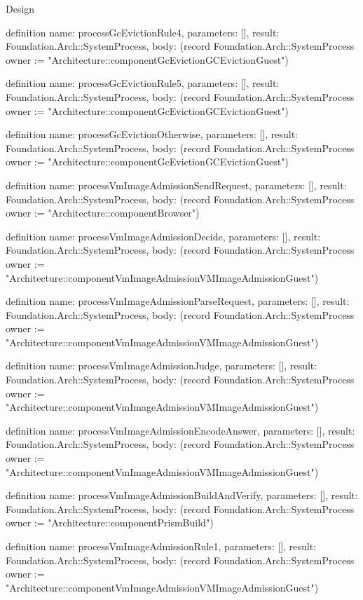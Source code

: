 \begin{lexlean}{Design}
\begin{semanticmodule}
definition{
  name: processGcEvictionRule4,
  parameters: [],
  result: Foundation.Arch::SystemProcess,
  body: (record Foundation.Arch::SystemProcess {owner := "Architecture::componentGcEvictionGCEvictionGuest"})
}

definition{
  name: processGcEvictionRule5,
  parameters: [],
  result: Foundation.Arch::SystemProcess,
  body: (record Foundation.Arch::SystemProcess {owner := "Architecture::componentGcEvictionGCEvictionGuest"})
}

definition{
  name: processGcEvictionOtherwise,
  parameters: [],
  result: Foundation.Arch::SystemProcess,
  body: (record Foundation.Arch::SystemProcess {owner := "Architecture::componentGcEvictionGCEvictionGuest"})
}

definition{
  name: processVmImageAdmissionSendRequest,
  parameters: [],
  result: Foundation.Arch::SystemProcess,
  body: (record Foundation.Arch::SystemProcess {owner := "Architecture::componentBrowser"})
}

definition{
  name: processVmImageAdmissionDecide,
  parameters: [],
  result: Foundation.Arch::SystemProcess,
  body: (record Foundation.Arch::SystemProcess {owner := "Architecture::componentVmImageAdmissionVMImageAdmissionGuest"})
}

definition{
  name: processVmImageAdmissionParseRequest,
  parameters: [],
  result: Foundation.Arch::SystemProcess,
  body: (record Foundation.Arch::SystemProcess {owner := "Architecture::componentVmImageAdmissionVMImageAdmissionGuest"})
}

definition{
  name: processVmImageAdmissionJudge,
  parameters: [],
  result: Foundation.Arch::SystemProcess,
  body: (record Foundation.Arch::SystemProcess {owner := "Architecture::componentVmImageAdmissionVMImageAdmissionGuest"})
}

definition{
  name: processVmImageAdmissionEncodeAnswer,
  parameters: [],
  result: Foundation.Arch::SystemProcess,
  body: (record Foundation.Arch::SystemProcess {owner := "Architecture::componentVmImageAdmissionVMImageAdmissionGuest"})
}

definition{
  name: processVmImageAdmissionBuildAndVerify,
  parameters: [],
  result: Foundation.Arch::SystemProcess,
  body: (record Foundation.Arch::SystemProcess {owner := "Architecture::componentPrismBuild"})
}

definition{
  name: processVmImageAdmissionRule1,
  parameters: [],
  result: Foundation.Arch::SystemProcess,
  body: (record Foundation.Arch::SystemProcess {owner := "Architecture::componentVmImageAdmissionVMImageAdmissionGuest"})
}


\end{semanticmodule}
\end{lexlean}
